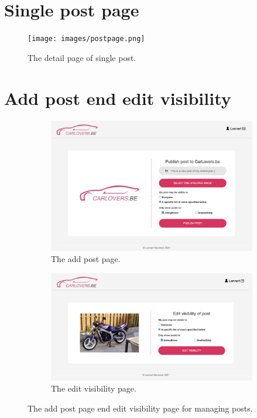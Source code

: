 \section*{Single post page}

\begin{figure}[H]
    \centering
    \texttt{[image: images/postpage.png]}
    \captionsetup{width=0.9\linewidth}
    \captionsetup{justification=centering}
    \caption{The detail page of single post.}
    \label{fig:single}
\end{figure}


\clearpage
\section*{Add post end edit visibility}

\begin{figure}[H]
     \centering
     \begin{subfigure}[b]{0.9\textwidth}
         \centering
         \includegraphics[width=\textwidth]{images/newpost2.png}
         \caption{The add post page.}
         \label{fig:addpost}
     \end{subfigure}
     \hfill
     \begin{subfigure}[b]{0.9\textwidth}
         \centering
         \includegraphics[width=\textwidth]{images/edit.png}
         \caption{The edit visibility page.}
         \label{fig:editpost}
     \end{subfigure}
        \caption{The add post page end edit visibility page for managing posts.}
        \label{fig:postmanage}
\end{figure}


